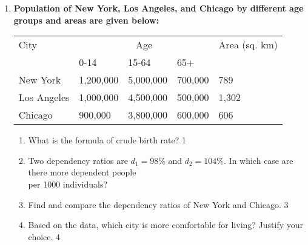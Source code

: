 \documentclass{article}
\begin{document}
\begin{enumerate}
    \item
  \textbf{Population of New York, Los Angeles, and Chicago by different age groups and areas are given below:} 
  
  \begin{table}[!h]
  \begin{center}
  \begin{tabular}{l|l|l|l|l}
  City         & \multicolumn{3}{c}{Age}         & Area (sq. km) \\ 
               & 0-14      & 15-64    & 65+      &               \\ \hline
  New York     & 1,200,000 & 5,000,000 & 700,000  & 789           \\ \hline
  Los Angeles  & 1,000,000 & 4,500,000 & 500,000  & 1,302         \\ \hline
  Chicago      & 900,000   & 3,800,000 & 600,000  & 606           \\
  \end{tabular}
  \end{center}
  \end{table}
  
  \begin{enumerate}
    \item What is the formula of crude birth rate? \hfill 1
 \item Two dependency ratios are $d_1=98\%$ and $d_2=104\%$. 
  In which case are there more dependent people \\
  per 1000 individuals? \hfill 
    \item  
    Find and compare the dependency ratios of New York and Chicago. \hfill 3
    \item
    Based on the data, which city is more comfortable for living? Justify your
    choice. \hfill 4
  \end{enumerate}
  
\end{enumerate}
\end{document}
